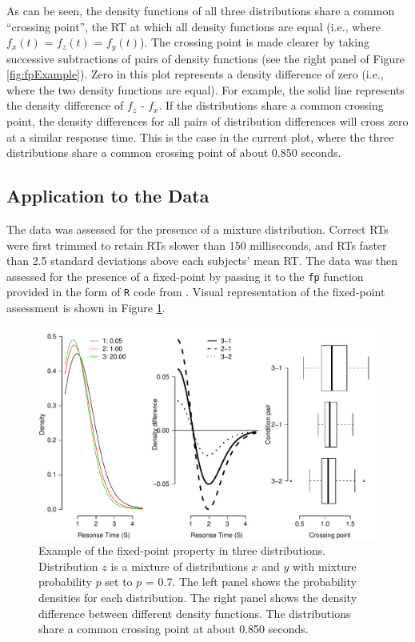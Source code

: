 \documentclass[a4paper, jou, natbib]{apa6}
\begin{document}
As can be seen, the density functions of all three distributions share a common ``crossing point'', the RT at which all density functions are equal (i.e., where $f_{x}(t)$ = $f_{z}(t)$ = $f_{y}(t)$). The crossing point is made clearer by taking successive subtractions of pairs of density functions (see the right panel of Figure \ref{fig:fpExample}). Zero in this plot represents a density difference of zero (i.e., where the two density functions are equal). For example, the solid line represents the density difference of $f_{z}$ - $f_{x}$. If the distributions share a common crossing point, the density differences for all pairs of distribution differences will cross zero at a similar response time. This is the case in the current plot, where the three distributions share a common crossing point of about 0.850 seconds.

\subsection{Application to the Data}
The data was assessed for the presence of a mixture distribution. Correct RTs were first trimmed to retain RTs slower than 150 milliseconds, and RTs faster than 2.5 standard deviations above each subjects' mean RT. The data was then assessed for the presence of a fixed-point by passing it to the \texttt{fp} function provided in the form of \texttt{R} code from \citet{VanMaanen2014}. Visual representation of the fixed-point assessment is shown in Figure \ref{fig:mixtureDistributionData}.

\begin{figure}
\begin{center}
\includegraphics[width = \textwidth]{Images/mixtureDistributionData.pdf}
\caption{Example of the fixed-point property in three distributions. Distribution $z$ is a mixture of distributions $x$ and $y$ with mixture probability $p$ set to $p$ = 0.7. The left panel shows the probability densities for each distribution. The right panel shows the density difference between different density functions. The distributions share a common crossing point at about 0.850 seconds.}
\label{fig:mixtureDistributionData}
\end{center}
\end{figure}
\end{document}
